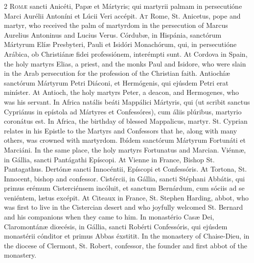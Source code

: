\begin{paracol}{2}
\lettrine[lines=2]{R}{omæ} sancti Anicéti, 
 Papæ et Mártyris; qui martyrii palmam in persecutióne Marci Aurélii Antoníni 
 et Lúcii Veri accépit.
\switchcolumn
{}
\lettrine[lines=2]{A}{t} Rome, St. Anicetus, pope and 
 martyr, who received the palm of martyrdom in the persecution of Marcus 
 Aurelius Antoninus and Lucius Verus.
\switchcolumn*
{}
Córdubæ, in Hispánia, sanctórum Mártyrum Elíæ Presbyteri, Pauli et Isidóri Monachórum, qui, in 
 persecutióne Arábica, ob Christiánæ fidei professiónem, interémpti sunt.
\switchcolumn
{}
At Cordova in Spain, the holy 
 martyrs Elias, a priest, and the monks Paul and Isidore, who were slain in 
 the Arab persecution for the profession of the Christian faith.
\switchcolumn*
{}
Antiochíæ sanctórum 
 Mártyrum Petri Diáconi, et Hermógenis, qui ejúsdem Petri erat miníster.
\switchcolumn
{}
At Antioch, the holy martyrs Peter, 
 a deacon, and Hermogenes, who was his servant.
\switchcolumn*
{}
In Africa natális 
 beáti Mappálici Mártyris, qui (ut scribit sanctus Cypriánus in epístola ad 
 Mártyres et Confessóres), cum áliis plúribus, martyrio coronátus est.
\switchcolumn
{}
In Africa, the birthday of blessed 
 Mappalicus, martyr. St. Cyprian relates in his Epistle to the Martyrs 
 and Confessors that he, along with many others, was crowned with martyrdom.
\switchcolumn*
{}
Ibídem sanctórum 
 Mártyrum Fortunáti et Marciáni.
\switchcolumn
{}
In the same place, the holy martyrs 
 Fortunatus and Marcian.
\switchcolumn*
{}
Viénnæ, in Gállia, 
 sancti Pantágathi Epíscopi.
\switchcolumn
{}
At Vienne in France, Bishop St. 
 Pantagathus.
\switchcolumn*
{}
Dertónæ sancti 
 Innocéntii, Epíscopi et Confessóris.
\switchcolumn
{}
At Tortona, St. Innocent, bishop 
 and confessor.
\switchcolumn*
{}
Cistércii, in Gállia, 
 sancti Stéphani Abbátis, qui primus erémum Cisterciénsem incóluit, et 
 sanctum Bernárdum, cum sóciis ad se veniéntem, lætus excépit.
\switchcolumn
{}
At Citeaux in France, St. Stephen Harding, 
 abbot, who was first to live in the Cistercian desert and who joyfully 
 welcomed St. Bernard and his companions when they came to him.
\switchcolumn*
{}
In monastério Casæ 
 Dei, Claromontánæ diœcésis, in Gállia, sancti Robérti Confessóris, qui 
 ejúsdem monastérii cónditor et primus Abbas éxstitit.
\switchcolumn
{}
In the monastery of Chaise-Dieu, in 
 the diocese of Clermont, St. Robert, confessor, the founder and first abbot 
 of the monastery.
\switchcolumn*
{}
\end{paracol}


